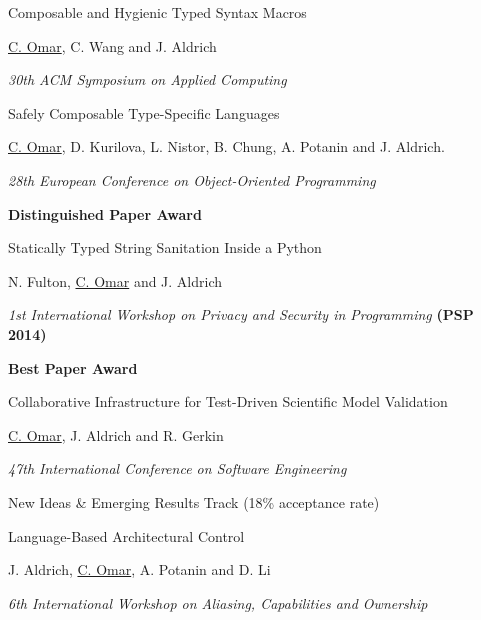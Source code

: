 \documentclass[10pt,letterpaper]{article}
\renewenvironment{itemize}{
  \begin{list}{}{
    \setlength{\leftmargin}{1.25em}
    \setlength{\itemsep}{0.25em}
    \setlength{\parskip}{0pt}
    \setlength{\parsep}{0.2em}
  }
}{
  \end{list}
}
\begin{document}
\begin{enumerate}[leftmargin=*, labelindent=6.5em, font=\bfseries]
\begin{itemize}
        \end{itemize}
  \item[SAC 2015] Composable and Hygienic Typed Syntax Macros
        \begin{itemize}
          \item \underline{C. Omar}, C. Wang and J. Aldrich
          \item \textit{30th ACM Symposium on Applied Computing}
        \end{itemize}
  \item[ECOOP 2014] {Safely Composable Type-Specific Languages}
        \begin{itemize}
          \item \underline{C. Omar}, D. Kurilova, L. Nistor, B. Chung, A. Potanin and J. Aldrich.
          \item \textit{28th European Conference on Object-Oriented Programming}
          \item \textbf{Distinguished Paper Award}
        \end{itemize}
  \item[PSP 2014] Statically Typed String Sanitation Inside a Python
        \begin{itemize}
          \item N. Fulton, \underline{C. Omar} and J. Aldrich
          \item \textit{1st International Workshop on Privacy and Security in Programming} {\textbf{(PSP 2014)}}
          \item \textbf{Best Paper Award}
        \end{itemize}
  \item[ICSE 2014] Collaborative Infrastructure for Test-Driven Scientific Model Validation
        \begin{itemize}
          \item \underline{C. Omar}, J. Aldrich and R. Gerkin
          \item \textit{47th International Conference on Software Engineering}
          \item New Ideas \& Emerging Results Track (18\% acceptance rate)
        \end{itemize}
  \item[IWACO 2014] Language-Based Architectural Control
        \begin{itemize}
          \item J. Aldrich, \underline{C. Omar}, A. Potanin and D. Li
          \item \textit{6th International Workshop on Aliasing, Capabilities and Ownership}

\end{itemize}
\end{enumerate}
\end{document}
